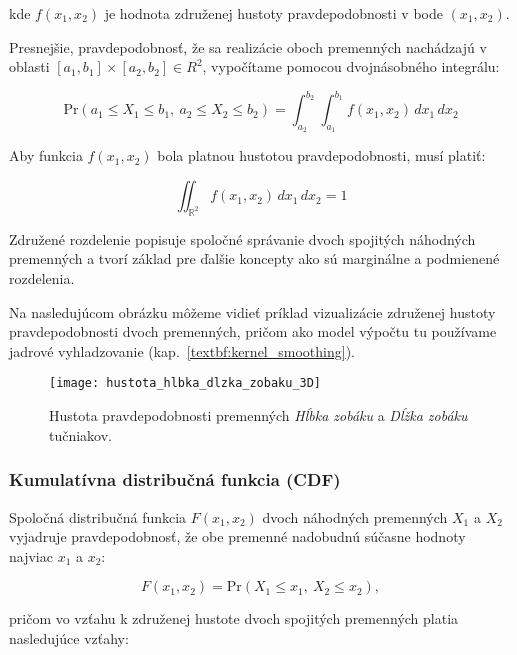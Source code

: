 kde $f(x_1, x_2)$ je hodnota združenej hustoty pravdepodobnosti v bode $(x_1, x_2)$.

Presnejšie, pravdepodobnosť, že sa realizácie oboch premenných nachádzajú v oblasti $[a_1, b_1] \times [a_2, b_2] \in R^2$, vypočítame pomocou dvojnásobného integrálu:

\begin{equation}
\mathrm{Pr}(a_1 \leq X_1 \leq b_1,\ a_2 \leq X_2 \leq b_2) = \int_{a_2}^{b_2} \int_{a_1}^{b_1} f(x_1, x_2) \, dx_1 \, dx_2
\end{equation}

Aby funkcia $f(x_1, x_2)$ bola platnou hustotou pravdepodobnosti, musí platiť:

\begin{equation}
\iint_{\mathbb{R}^2} f(x_1, x_2) \, dx_1 \, dx_2 = 1
\end{equation}

Združené rozdelenie popisuje spoločné správanie dvoch spojitých náhodných premenných a tvorí základ pre ďalšie koncepty ako sú marginálne a podmienené rozdelenia.

Na nasledujúcom obrázku môžeme vidieť príklad vizualizácie združenej hustoty pravdepodobnosti dvoch premenných, pričom ako model výpočtu tu používame jadrové vyhladzovanie (kap.~\ref{textbf:kernel_smoothing}).

\begin{figure}[htpb]
    \centering
    \texttt{[image: hustota\_hlbka\_dlzka\_zobaku\_3D]}
    \caption{Hustota pravdepodobnosti premenných \textit{Hĺbka zobáku} a \textit{Dĺžka zobáku} tučniakov.}
    \label{fig:zobak_joint_density}
\end{figure}

\subsubsection{Kumulatívna distribučná funkcia (CDF)}\label{subsec:joint_cdf}

Spoločná distribučná funkcia $F(x_1, x_2)$ dvoch náhodných premenných $X_1$ a $X_2$ vyjadruje pravdepodobnosť, že obe premenné nadobudnú súčasne hodnoty najviac $x_1$ a $x_2$:

\begin{equation}
F(x_1, x_2) = \mathrm{Pr}(X_1 \leq x_1,\ X_2 \leq x_2),
\end{equation}

pričom vo vzťahu k združenej hustote dvoch spojitých premenných platia nasledujúce vzťahy:

